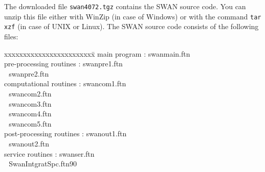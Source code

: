 \documentclass[12pt]{book}
\begin{document}
The downloaded file {\tt swan4072.tgz} contains the SWAN source code. You can unzip this
file either with WinZip (in case of Windows) or with the command {\tt tar xzf} (in case of
UNIX or Linux). The SWAN source code consists of the following files:
\begin{tabbing}
xxxxxxxxxxxxxxxxxxxxxxxx\= \kill
main program             \>:       swanmain.ftn \\
pre-processing routines  \>:       swanpre1.ftn \\
                         \> $\,\,$ swanpre2.ftn \\
computational routines   \>:       swancom1.ftn \\
                         \> $\,\,$ swancom2.ftn \\
                         \> $\,\,$ swancom3.ftn \\
                         \> $\,\,$ swancom4.ftn \\
                         \> $\,\,$ swancom5.ftn \\
post-processing routines \>:       swanout1.ftn \\
                         \> $\,\,$ swanout2.ftn \\
service routines         \>:       swanser.ftn \\
                         \> $\,\,$ SwanIntgratSpc.ftn90 \\
\end{tabbing}
\newpage
\end{document}
